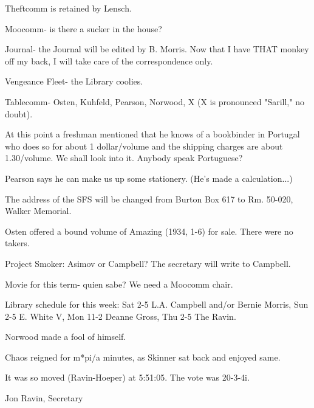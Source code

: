 \documentclass[12pt]{article}
\begin{document}
Theftcomm is retained by Lensch.

Moocomm- is there a sucker in the house?

Journal- the Journal will be edited by B. Morris. Now that I have THAT monkey off my back, I will take care of the correspondence only.

Vengeance Fleet- the Library coolies.

Tablecomm- Osten, Kuhfeld, Pearson, Norwood, X (X is pronounced "Sarill," no doubt).

At this point a freshman mentioned that he knows of a bookbinder in Portugal who does so for about 1 dollar/volume and the shipping charges are about 1.30/volume. We shall look into it. Anybody speak Portuguese?

Pearson says he can make us up some stationery. (He's made a calculation...)

The address of the SFS will be changed from Burton Box 617 to Rm. 50-020, Walker Memorial.

Osten offered a bound volume of Amazing (1934, 1-6) for sale. There were no takers.

Project Smoker: Asimov or Campbell? The secretary will write to Campbell.

Movie for this term- quien sabe? We need a Moocomm chair.

Library schedule for this week: Sat 2-5 L.A. Campbell and/or Bernie Morris, Sun 2-5 E. White V, Mon 11-2 Deanne Gross, Thu 2-5 The Ravin.

Norwood made a fool of himself.

Chaos reigned for m*pi/a minutes, as Skinner sat back and enjoyed same.

It was so moved (Ravin-Hoeper) at 5:51:05. The vote was 20-3-4i.

\vspace{12pt}

\centerline{Jon Ravin, Secretary}
\end{document}
